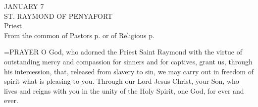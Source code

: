 \begin{center}\normalsize JANUARY 7\\
\footnotesize ST. RAYMOND OF PENYAFORT\\
\footnotesize Priest\\
\footnotesize From the common of Pastors p.  or of Religious p.  \\
\end{center}

\hangindent=\parindent \small{PRAYER 
O God, who adorned the Priest Saint Raymond
with the virtue of outstanding mercy and compassion
for sinners and for captives,
grant us, through his intercession,
that, released from slavery to sin,
we may carry out in freedom of spirit
what is pleasing to you.
Through our Lord Jesus Christ, your Son,
who lives and reigns with you in the unity of the Holy Spirit,
one God, for ever and ever.\\}
 

